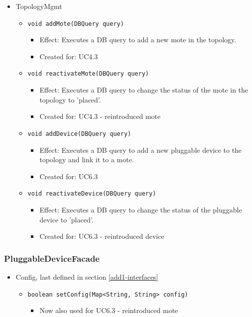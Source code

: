 {{{\begin{itemize}
        	\item TopologyMgmt
        	\begin{itemize}
        		\item \texttt{void addMote(DBQuery query)}
        		\begin{itemize}
                    \item Effect: Executes a DB query to add a new mote in the topology.
        			\item Created for: UC4.3
        		\end{itemize}
                \item \texttt{void reactivateMote(DBQuery query)}
                    \begin{itemize}
                        \item Effect: Executes a DB query to change the status of the mote in the topology to 'placed'.
                        \item Created for: UC4.3 - reintroduced mote
                    \end{itemize}
                \item \texttt{void addDevice(DBQuery query)}
                    \begin{itemize}
                        \item Effect: Executes a DB query to add a new pluggable device to the topology and link it to a mote.
                        \item Created for: UC6.3
                    \end{itemize}
                \item \texttt{void reactivateDevice(DBQuery query)}
                    \begin{itemize}
                        \item Effect: Executes a DB query to change the status of the pluggable device to 'placed'.
                        \item Created for: UC6.3 - reintroduced device
                    \end{itemize}
        	\end{itemize}
        \end{itemize}

    \subsubsection{PluggableDeviceFacade}
        \begin{itemize}
        	\item Config, last defined in section \ref{add1-interfaces}
        	\begin{itemize}
                \item \texttt{boolean setConfig(Map<String, String> config)}
                    \begin{itemize}
                        \item Now also used for UC6.3 - reintroduced mote
                    \end{itemize}
            \end{itemize}
        \end{itemize}

}}}
